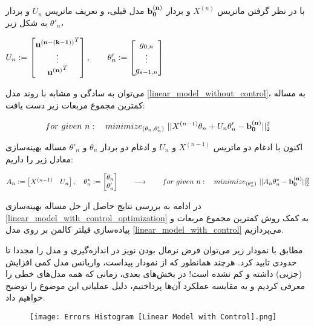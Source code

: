 \documentclass{scribe-cgenomics}
\begin{document}
با در نظر گرفتن ماتریس
$X^{(n)}$
و بردار
$\bold{b^{(n)}_0}$
مدل قبلی، و تعریف ماتریس
$U_{n}$
و بردار
$\theta'_n$
به شکل زیر،

\begin{center}
$
U_{n} := 
\begin{bmatrix}
\bold{u^{(n - (k-1))}}^T \\
\vdots \\
\bold{u^{(n)}}^T \\
\end{bmatrix},
\qquad
\theta'_n :=
\begin{bmatrix}
g_{0,n} \\
\vdots \\
g_{s-1,n}
\end{bmatrix}
$
\end{center}

می‌توان به سادگی و مشابه با روند مدل
\ref{linear_model_without_control}،
به مساله کمترین مجموع مربعات زیر دست یافت:

\begin{equation}\label{linear_model_with_control_optimization}
for\ given\ n:\quad minimize_{(\theta_n, \theta'_n)}\ ||X^{(n-1)}\theta_n + U_{n}\theta'_n - \bold{b^{(n)}_0}||_2^2
\end{equation}

اکنون با ادغام دو ماتریس
$X^{(n-1)}$
و
$U_n$
و ادغام دو بردار
$\theta_n$
و
$\theta'_n$
مساله بهینه‌سازی معادل زیر را داریم:

\begin{center}
$
A_n := 
\begin{bmatrix}
X^{(n-1)} & U_n
\end{bmatrix},
\quad
\theta^*_n :=
\begin{bmatrix}
\theta_n \\
\theta'_n
\end{bmatrix}
\qquad
\longrightarrow
\qquad
for\ given\ n:\quad minimize_{(\theta^*_n)}\ ||A_n\theta^*_n - \bold{b^{(n)}_0}||_2^2
$
\end{center}


در ادامه به بررسی نتایج حاصل از حل مساله بهینه‌سازی
\ref{linear_model_with_control_optimization}
به کمک روش کمترین مجموع مربعات و پیاده‌سازی فیلتر کالمن بر روی مدل
\ref{linear_model_with_control}
می‌پردازیم.

\begin{مشاهده}
مطابق با نمودار زیر می‌توان فرض نرمال بودن نویز در اندازه‌گیری و مدل را مجددا تا حدودی تایید کرد. هرچند همانطور که از نمودار پیداست، واریانس مدل کمی افزایش (جزیی) داشته و کم نشده است! در بخش‌های بعدی، زمانی که همه مدل‌های خطی را معرفی کردیم و به مقایسه عملکرد آن‌ها پرداختیم، دلیل عملیاتی این موضوع را توضیح خواهیم داد.

\begin{figure}
\texttt{[image: Errors Histogram [Linear Model with Control].png]}
\centering
\end{figure}
\end{مشاهده}
\end{document}
